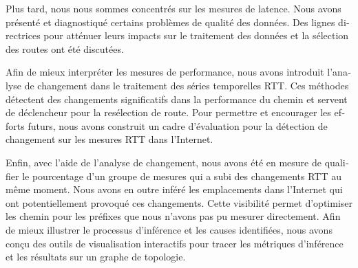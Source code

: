 \begin{otherlanguage}{french}
Plus tard, nous nous sommes concentrés sur les mesures de latence.
Nous avons présenté et diagnostiqué certains problèmes de qualité des données.
Des lignes directrices pour atténuer leurs impacts sur le traitement des données et la sélection des routes ont été discutées.

Afin de mieux interpréter les mesures de performance, nous avons introduit l'analyse de changement dans le traitement des séries temporelles RTT.
Ces méthodes détectent des changements significatifs dans la performance du chemin et servent de déclencheur pour la resélection de route.
Pour permettre et encourager les efforts futurs, nous avons construit un cadre d'évaluation pour la détection de changement sur les mesures RTT dans l'Internet.

Enfin, avec l'aide de l'analyse de changement, nous avons été en mesure de qualifier le pourcentage d'un groupe de mesures qui a subi des changements RTT au même moment.
Nous avons en outre inféré les emplacements dans l'Internet qui ont potentiellement provoqué ces changements.
Cette visibilité permet d'optimiser les chemin pour les préfixes que nous n'avons pas pu mesurer directement.
Afin de mieux illustrer le processus d'inférence et les causes identifiées, 
nous avons conçu des outils de visualisation interactifs pour tracer les métriques d'inférence et les résultats sur un graphe de topologie.

\end{otherlanguage}
\endgroup			

